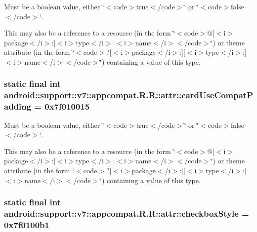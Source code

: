 Must be a boolean value, either \char`\"{}$<$code$>$true$<$/code$>$\char`\"{} or \char`\"{}$<$code$>$false$<$/code$>$\char`\"{}. 

This may also be a reference to a resource (in the form \char`\"{}$<$code$>$@\mbox{[}$<$i$>$package$<$/i$>$:\mbox{]}$<$i$>$type$<$/i$>$:$<$i$>$name$<$/i$>$$<$/code$>$\char`\"{}) or theme attribute (in the form \char`\"{}$<$code$>$?\mbox{[}$<$i$>$package$<$/i$>$:\mbox{]}\mbox{[}$<$i$>$type$<$/i$>$:\mbox{]}$<$i$>$name$<$/i$>$$<$/code$>$\char`\"{}) containing a value of this type. \hypertarget{classandroid_1_1support_1_1v7_1_1appcompat_1_1_r_1_1attr_b439d93cd16a6038d06d9ab8d4ac917b}{
\subsubsection[{cardUseCompatPadding}]{\setlength{\rightskip}{0pt plus 5cm}static final int android::support::v7::appcompat.R.R::attr::cardUseCompatPadding = 0x7f010015}}
\label{classandroid_1_1support_1_1v7_1_1appcompat_1_1_r_1_1attr_b439d93cd16a6038d06d9ab8d4ac917b}


Must be a boolean value, either \char`\"{}$<$code$>$true$<$/code$>$\char`\"{} or \char`\"{}$<$code$>$false$<$/code$>$\char`\"{}. 

This may also be a reference to a resource (in the form \char`\"{}$<$code$>$@\mbox{[}$<$i$>$package$<$/i$>$:\mbox{]}$<$i$>$type$<$/i$>$:$<$i$>$name$<$/i$>$$<$/code$>$\char`\"{}) or theme attribute (in the form \char`\"{}$<$code$>$?\mbox{[}$<$i$>$package$<$/i$>$:\mbox{]}\mbox{[}$<$i$>$type$<$/i$>$:\mbox{]}$<$i$>$name$<$/i$>$$<$/code$>$\char`\"{}) containing a value of this type. \hypertarget{classandroid_1_1support_1_1v7_1_1appcompat_1_1_r_1_1attr_a8add12cf7fd8fc3504546c37be1aecc}{
\subsubsection[{checkboxStyle}]{\setlength{\rightskip}{0pt plus 5cm}static final int android::support::v7::appcompat.R.R::attr::checkboxStyle = 0x7f0100b1}}
\label{classandroid_1_1support_1_1v7_1_1appcompat_1_1_r_1_1attr_a8add12cf7fd8fc3504546c37be1aecc}


